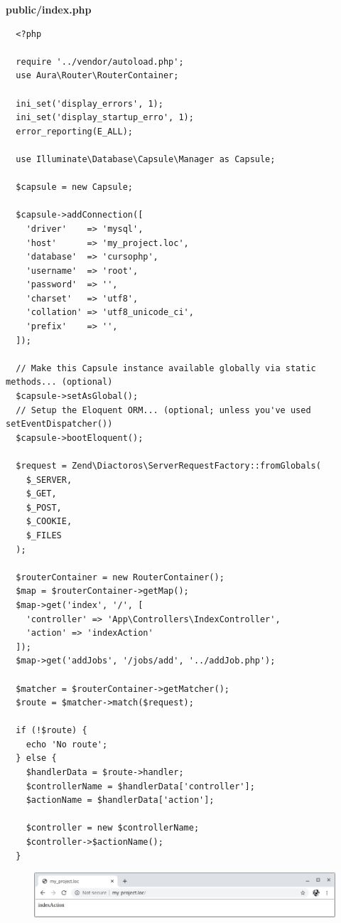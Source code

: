 \documentclass{article}
\begin{document}
\newpage

\textbf{public/index.php}
\begin{verbatim}
  <?php

  require '../vendor/autoload.php';
  use Aura\Router\RouterContainer;

  ini_set('display_errors', 1);
  ini_set('display_startup_erro', 1);
  error_reporting(E_ALL);

  use Illuminate\Database\Capsule\Manager as Capsule;

  $capsule = new Capsule;

  $capsule->addConnection([
    'driver'    => 'mysql',
    'host'      => 'my_project.loc',
    'database'  => 'cursophp',
    'username'  => 'root',
    'password'  => '',
    'charset'   => 'utf8',
    'collation' => 'utf8_unicode_ci',
    'prefix'    => '',
  ]);

  // Make this Capsule instance available globally via static methods... (optional)
  $capsule->setAsGlobal();
  // Setup the Eloquent ORM... (optional; unless you've used setEventDispatcher())
  $capsule->bootEloquent();

  $request = Zend\Diactoros\ServerRequestFactory::fromGlobals(
    $_SERVER,
    $_GET,
    $_POST,
    $_COOKIE,
    $_FILES
  );

  $routerContainer = new RouterContainer();
  $map = $routerContainer->getMap();
  $map->get('index', '/', [
    'controller' => 'App\Controllers\IndexController',
    'action' => 'indexAction'
  ]);
  $map->get('addJobs', '/jobs/add', '../addJob.php');

  $matcher = $routerContainer->getMatcher();
  $route = $matcher->match($request);

  if (!$route) {
    echo 'No route';
  } else {
    $handlerData = $route->handler;
    $controllerName = $handlerData['controller'];
    $actionName = $handlerData['action'];

    $controller = new $controllerName;
    $controller->$actionName();
  }
\end{verbatim}

\begin{figure}[h!]
  \centering
  \includegraphics[scale=0.5]{./Pictures/127_controller_array_method.png}
\end{figure}
\end{document}
